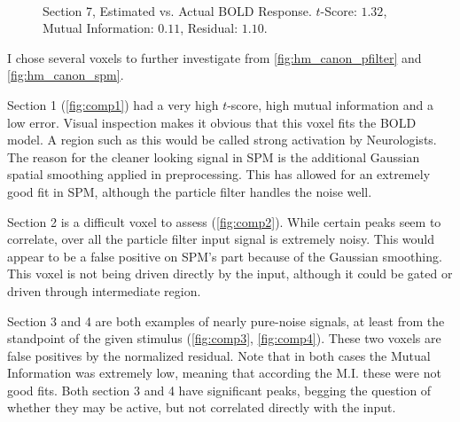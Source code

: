 \begin{figure}
\centering
{}\\
\caption{Section 7, Estimated vs. Actual BOLD Response. $t$-Score: $1.32$, Mutual Information: $0.11$, Residual: $1.10$.}
\label{fig:comp7}
\end{figure}

I chose several voxels to further investigate from \autoref{fig:hm_canon_pfilter} and \autoref{fig:hm_canon_spm}.

Section 1 (\autoref{fig:comp1}) had a very high $t$-score, high mutual information and
a low error. Visual inspection makes it obvious that this voxel fits the BOLD model. A region
such as this would be called strong activation by Neurologists. The
reason for the cleaner looking signal in SPM is the additional Gaussian spatial smoothing
applied in preprocessing. This
has allowed for an extremely good fit in SPM, although the particle filter handles the noise
well.

Section 2 is a difficult voxel to assess (\autoref{fig:comp2}).
While certain peaks seem to correlate, over all
the particle filter input signal is extremely noisy.
This would appear to be a false positive on SPM's part because of the Gaussian smoothing.
This voxel is not being driven directly by the input, although it
could be gated or driven through intermediate region.

Section 3 and 4 are both examples of nearly pure-noise signals, at least from the standpoint
of the given stimulus (\autoref{fig:comp3}, \autoref{fig:comp4}).
These two voxels are false positives by the normalized residual.
Note that in both cases the Mutual Information was extremely low, meaning that
according the M.I. these were not good fits. Both section 3 and 4 have
significant peaks, begging the question of whether they may be active,
but not correlated directly with the input.

